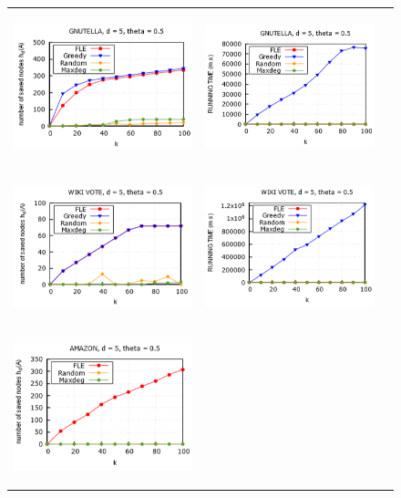 \begin{figure}[H]
	\begin{tabular}{lll}
		\includegraphics[height = 4.4cm]{picture/FLE/gnu_res} &
		\includegraphics[height = 4.4cm]{picture/FLE/gnu_time} 
		\\
		\includegraphics[height = 4.4cm]{picture/FLE/wiki_res} &
		\includegraphics[height = 4.4cm]{picture/FLE/wiki_time} 
		\\
		\includegraphics[height = 4.4cm]{picture/FLE/amazon_res} &

\end{tabular}
\end{figure}
